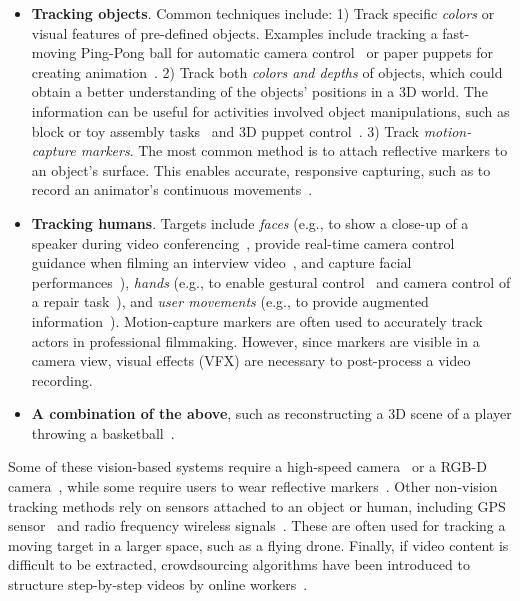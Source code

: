 \begin{itemize}
  \item \textbf{Tracking objects}. Common techniques include:
  1) Track specific \emph{colors} or visual features of pre-defined objects. Examples include tracking a fast-moving Ping-Pong ball for automatic camera control~\cite{Okumura:2011tr} or paper puppets for creating animation~\cite{Barnes:2008:VideoPuppetry}.
  2) Track both \emph{colors and depths} of objects, which could obtain a better understanding of the objects' positions in a 3D world. The information can be useful for activities involved object manipulations, such as block or toy assembly tasks~\cite{Gupta2012DuploTrack,Wu:2016:ARI:2856400.2856416} and 3D puppet control~\cite{held20123d}.
  3) Track \emph{motion-capture markers}. The most common method is to attach reflective markers to an object's surface. This enables accurate, responsive capturing, such as to record an animator's continuous movements~\cite{Dontcheva:2003:LAC:1201775.882285}.
  \item \textbf{Tracking humans}. Targets include \emph{faces} (e.g., to show a close-up of a speaker during video conferencing~\cite{Ranjan:2010}, provide real-time camera control guidance when filming an interview video~\cite{Carter:2010}, and capture facial performances~\cite{Shi:2014:AAH:2661229.2661290,thies2016face}), \emph{hands} (e.g., to enable gestural control~\cite{taylor-siggraph2016} and camera control of a repair task~\cite{Ranjan:2008}), and \emph{user movements} (e.g., to provide augmented information~\cite{Wilson:2012fb,Anderson:2013:YEM:2501988.2502045}).
  Motion-capture markers are often used to accurately track actors in professional filmmaking. However, since markers are visible in a camera view, visual effects (VFX) are necessary to post-process a video recording.
  \item \textbf{A combination of the above}, such as reconstructing a 3D scene of a player throwing a basketball~\cite{dou-siggraph2016}.
\end{itemize}

Some of these vision-based systems require a high-speed camera~\cite{Okumura:2011tr} or a RGB-D camera~\cite{Gupta2012DuploTrack,Wu:2016:ARI:2856400.2856416,held20123d,Wilson:2012fb,Anderson:2013:YEM:2501988.2502045,dou-siggraph2016}, while some require users to wear reflective markers~\cite{Ranjan:2008}.
%
Other non-vision tracking methods rely on sensors attached to an object or human, including GPS sensor~\cite{HexoDrone} and radio frequency wireless signals~\cite{Nguyen:2016:ICR:2935620.2935632}. These are often used for tracking a moving target in a larger space, such as a flying drone.
%
Finally, if video content is difficult to be extracted, crowdsourcing algorithms have been introduced to structure step-by-step videos by online workers~\cite{Kim:2014:CSI:2611222.2556986}.

